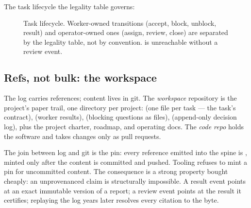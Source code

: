 The task lifecycle the legality table governs:

\begin{figure}[h]
\centering
{}
\caption{Task lifecycle. Worker-owned transitions (accept, block, unblock, result) and operator-owned ones (assign, review, close) are separated by the legality table, not by convention.  is unreachable without a review event.}
\end{figure}

\subsection{Refs, not bulk: the workspace}

The log carries references; content lives in git. The \emph{workspace} repository is the project's paper trail, one directory per project:  (one file per task --- the task's contract),  (worker results),  (blocking questions as files),  (append-only decision log), plus the project charter, roadmap, and operating docs. The \emph{code repo} holds the software and takes changes only as pull requests.

The join between log and git is the pin: every reference emitted into the spine is , minted only after the content is committed and pushed. Tooling refuses to mint a pin for uncommitted content. The consequence is a strong property bought cheaply: an unprovenanced claim is structurally impossible. A result event points at an exact immutable version of a report; a review event points at the result it certifies; replaying the log years later resolves every citation to the byte.

